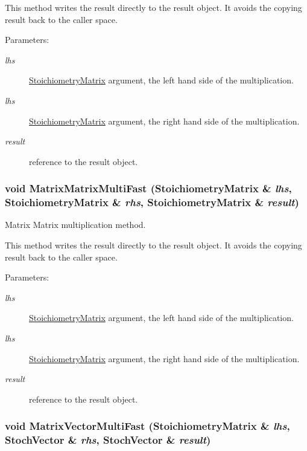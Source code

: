 This method writes the result directly to the result object. It avoids the copying result back to the caller space. \begin{Desc}
\item[Parameters:]
\begin{description}
\item[{\em lhs}]\hyperlink{class_stoichiometry_matrix}{StoichiometryMatrix} argument, the left hand side of the multiplication. \item[{\em lhs}]\hyperlink{class_stoichiometry_matrix}{StoichiometryMatrix} argument, the right hand side of the multiplication. \item[{\em result}]reference to the result object. \end{description}
\end{Desc}
\hypertarget{class_stoichiometry_matrix_94eca91b8577196b287e2126626a1738}{
\subsubsection{\setlength{\rightskip}{0pt plus 5cm}void MatrixMatrixMultiFast ({\bf StoichiometryMatrix} \& {\em lhs}, \/  {\bf StoichiometryMatrix} \& {\em rhs}, \/  {\bf StoichiometryMatrix} \& {\em result})}}
\label{class_stoichiometry_matrix_94eca91b8577196b287e2126626a1738}


Matrix Matrix multiplication method. 

This method writes the result directly to the result object. It avoids the copying result back to the caller space. \begin{Desc}
\item[Parameters:]
\begin{description}
\item[{\em lhs}]\hyperlink{class_stoichiometry_matrix}{StoichiometryMatrix} argument, the left hand side of the multiplication. \item[{\em lhs}]\hyperlink{class_stoichiometry_matrix}{StoichiometryMatrix} argument, the right hand side of the multiplication. \item[{\em result}]reference to the result object. \end{description}
\end{Desc}
\hypertarget{class_stoichiometry_matrix_cbfe448187d00443c3a60c2c2c6c3064}{
\subsubsection{\setlength{\rightskip}{0pt plus 5cm}void MatrixVectorMultiFast ({\bf StoichiometryMatrix} \& {\em lhs}, \/  {\bf StochVector} \& {\em rhs}, \/  {\bf StochVector} \& {\em result})}}
\label{class_stoichiometry_matrix_cbfe448187d00443c3a60c2c2c6c3064}


